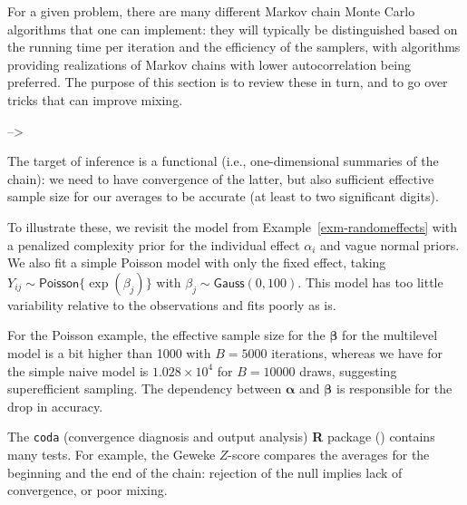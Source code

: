 \documentclass[
  11pt,
  letterpaper,
]{scrbook}
\theoremstyle{definition}
\theoremstyle{plain}
\theoremstyle{plain}
\theoremstyle{plain}
\theoremstyle{definition}
\theoremstyle{definition}
\theoremstyle{remark}
\begin{document}
For a given problem, there are many different Markov chain Monte Carlo
algorithms that one can implement: they will typically be distinguished
based on the running time per iteration and the efficiency of the
samplers, with algorithms providing realizations of Markov chains with
lower autocorrelation being preferred. The purpose of this section is to
review these in turn, and to go over tricks that can improve mixing.

--\textgreater{}

The target of inference is a functional (i.e., one-dimensional summaries
of the chain): we need to have convergence of the latter, but also
sufficient effective sample size for our averages to be accurate (at
least to two significant digits).

To illustrate these, we revisit the model from
Example~\ref{exm-randomeffects} with a penalized complexity prior for
the individual effect \(\alpha_i\) and vague normal priors. We also fit
a simple Poisson model with only the fixed effect, taking
\(Y_{ij} \sim \mathsf{Poisson}\{\exp(\beta_j)\}\) with
\(\beta_j \sim \mathsf{Gauss}(0,100)\). This model has too little
variability relative to the observations and fits poorly as is.

For the Poisson example, the effective sample size for the
\(\boldsymbol{\beta}\) for the multilevel model is a bit higher than
1000 with \(B=5000\) iterations, whereas we have for the simple naive
model is \(\ensuremath{1.028\times 10^{4}}\) for \(B=10000\) draws,
suggesting superefficient sampling. The dependency between
\(\boldsymbol{\alpha}\) and \(\boldsymbol{\beta}\) is responsible for
the drop in accuracy.

The \texttt{coda} (convergence diagnosis and output analysis) \textbf{R}
package () contains many tests.
For example, the Geweke \(Z\)-score compares the averages for the
beginning and the end of the chain: rejection of the null implies lack
of convergence, or poor mixing.
\end{document}
